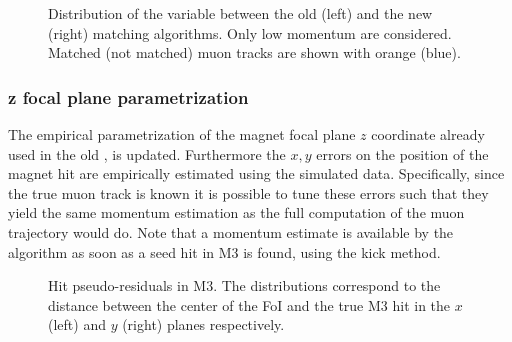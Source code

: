 \begin{figure}[t]
  \centering
  \begin{subfigure}{0.5\textwidth}
    \scalebox{.6}{}
    \caption{}
    \label{mvTTm_chi2}
  \end{subfigure}%
  \hfill%
  \begin{subfigure}{0.5\textwidth}
    \scalebox{.6}{}
    \caption{}
    \label{mvm_chi2}
  \end{subfigure}
  \caption{Distribution of the \chisq variable between the old (left) and the new (right) matching algorithms.
           Only low momentum \veloTracks are considered. Matched (not matched) muon tracks are shown with orange (blue).}
 \label{mvm_chi2_comp}
\end{figure}

\subsubsection{z focal plane parametrization}
The empirical parametrization of the magnet focal plane $z$ coordinate already used in the old \mvm\cite{roelThesis},
is updated. Furthermore the $x,y$ errors on the position of the magnet hit are empirically estimated using the simulated data.
Specifically, since the true muon track is known it is possible to tune these errors such that they yield the same momentum
estimation as the full computation of the muon trajectory would do. Note that a momentum estimate is available by the
\mvTTm algorithm as soon as a seed hit in M3 is found, using the kick method.

\begin{figure}[t]
  \centering
  \begin{subfigure}{0.5\textwidth}
    \scalebox{.6}{}
    \caption{}
    \label{mvTTm_res_x}
  \end{subfigure}%
  \hfill%
  \begin{subfigure}{0.5\textwidth}
    \scalebox{.6}{}
    \caption{}
    \label{mvm_res_y}
  \end{subfigure}
  \caption{Hit pseudo-residuals in M3. The distributions correspond to the distance between the center of the FoI and the true M3 hit
           in the $x$ (left) and $y$ (right) planes respectively.}
 \label{mvm_res}
\end{figure}

